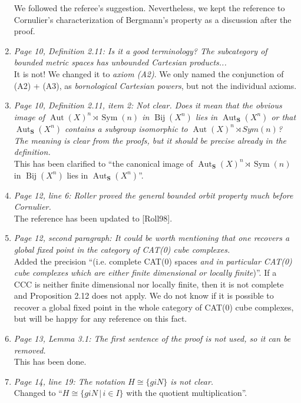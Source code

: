 \documentclass[english,a4paper]{article}
\DeclareMathOperator\Aut{Aut}
\DeclareMathOperator\Sym{Sym}
\DeclareMathOperator\Bij{Bij}
\newcommand*\setst[2]{\{#1\,|\,#2\}}
\begin{document}
\begin{enumerate}
We followed the referee's suggestion. Nevertheless, we kept the reference to Cornulier's characterization of Bergmann's property as a discussion after the proof.



%
\item\textit{Page 10, Definition 2.11: Is it a good terminology? The subcategory of bounded metric spaces has unbounded Cartesian products...}\\
It is not! We changed it to \emph{axiom (A2)}. We only named the conjunction of (A2) + (A3), as \emph{bornological Cartesian powers}, but not the individual axioms.
%
\item\textit{Page 10, Definition 2.11, item 2: Not clear. Does it mean that the obvious image of $\Aut(X)^n\rtimes\Sym(n)$ in $\Bij(X^n)$ lies in $\Aut_{\mathbf S}(X^n)$ or that $\Aut_{\mathbf S}(X^n)$ contains a subgroup isomorphic to $\Aut(X)^n\rtimes Sym(n)$? The meaning is clear from the proofs, but it should be precise already in the definition.}\\
This has been clarified to ``the canonical image of $\Aut_{\mathbf S}(X)^n\rtimes \Sym(n)$ in $\Bij(X^n)$ lies in $\Aut_{\mathbf S}(X^n)$''.
%
\item\textit{Page 12, line 6: Roller proved the general bounded orbit property much before Cornulier.}\\
The reference has been updated to [Roll98].
%
\item\textit{Page 12, second paragraph: It could be worth mentioning that one recovers a global fixed point in the category of CAT(0) cube complexes.
}\\
Added the precision ``(i.e. complete CAT(0) spaces \emph{and in particular CAT(0) cube complexes which are either finite dimensional or locally finite})''.
If a CCC is neither finite dimensional nor locally finite, then it is not complete and Proposition 2.12 does not apply.
We do not know if it is possible to recover a global fixed point in the whole category of CAT(0) cube complexes, but will be happy for any reference on this fact.
%
\item\textit{Page 13, Lemma 3.1: The first sentence of the proof is not used, so it can be removed.}\\
This has been done.
%
\item\textit{Page 14, line 19: The notation $H\cong\{giN\}$ is not clear.}\\
Changed to ``$H\cong\setst{giN}{i\in I}$ with the quotient multiplication''.
%

\end{enumerate}
\end{document}
